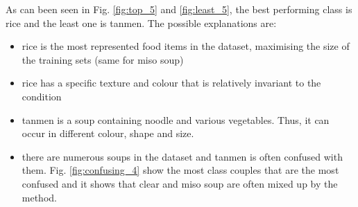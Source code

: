 As can been seen in Fig. \ref{fig:top_5} and \ref{fig:least_5}, the best performing class is rice and the least one is tanmen. The possible explanations are:
\begin{itemize}
    \item rice is the most represented food items in the dataset, maximising the size of the training sets (same for miso soup)
    \item rice has a specific texture and colour that is relatively invariant to the condition
    \item tanmen is a soup containing noodle and various vegetables. Thus, it can occur in different colour, shape and size.
    \item there are numerous soups in the dataset and tanmen is often confused with them. Fig. \ref{fig:confusing_4} show the most class couples that are the most confused and it shows that clear  and miso soup are often mixed up by the method.
\end{itemize}


